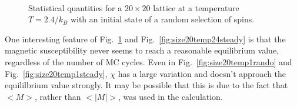 \documentclass[12pt]{article}
\numberwithin{equation}{section}
\begin{document}
\begin{figure}[h]
\begin{center}
 \\
\caption{Statistical quantities for a $20\times20$ lattice at a temperature $T=2.4/k_{B}$ with an initial state of a random selection of spins.}
\label{fig:size20temp24rando}
\end{center}
\end{figure}
 
\par One interesting feature of Fig.~\ref{fig:size20temp24rando} and Fig.~\ref{fig:size20temp24steady} is that the magnetic susceptibility never seems to reach a reasonable equilibrium value, regardless of the number of MC cycles.  Even in Fig.~\ref{fig:size20temp1rando} and Fig.~\ref{fig:size20temp1steady}, $\chi$ has a large variation and doesn't approach the equililbrium value strongly.  It may be possible that this is due to the fact that $<M>$, rather than $<|M|>$, was used in the calculation.
\end{document}
